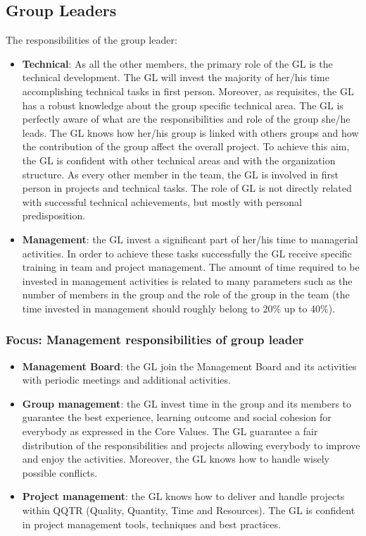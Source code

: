 \documentclass[graybox]{svmult}
\begin{document}
\subsection{Group Leaders}
The responsibilities of the group leader:
\begin{itemize}
\item \textbf{Technical}: As all the other members, the primary role of the GL is the technical development. The GL will invest the majority of her/his time accomplishing technical tasks in first person. Moreover, as requisites, the GL has a robust knowledge about the group specific technical area. The GL is perfectly aware of what are the responsibilities and role of the group she/he leads. The GL knows how her/his group is linked with others groups and how the contribution of the group affect the overall project. To achieve this aim, the GL is confident with other technical areas and with the organization structure. As every other member in the team, the GL is involved in first person in projects and technical tasks. The role of GL is not directly related with successful technical achievements, but mostly with personal predisposition.
\item \textbf{Management}: the GL invest a significant part of her/his time to managerial activities. In order to achieve these tasks successfully the GL receive specific training in team and project management. The amount of time required to be invested in management activities is related to many parameters such as the number of members in the group and the role of the group in the team (the time invested in management should roughly belong to 20$\%$ up to 40$\%$).
\end{itemize}

\subsubsection{Focus: Management responsibilities of group leader}
\begin{itemize}
\item \textbf{Management Board}: the GL join the Management Board and its activities with periodic meetings and additional activities.
\item \textbf{Group management}: the GL invest time in the group and its members to guarantee the best experience, learning outcome and social cohesion for everybody as expressed in the Core Values. The GL guarantee a fair distribution of the responsibilities and projects allowing everybody to improve and enjoy the activities. Moreover, the GL knows how to handle wisely possible conflicts.
\item \textbf{Project management}: the GL knows how to deliver and handle projects within QQTR (Quality, Quantity, Time and Resources). The GL is confident in project management tools, techniques and best practices.
\end{itemize}
    
\end{document}
